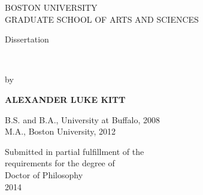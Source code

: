 \begin{titlepage}   %
\begin{center}

  BOSTON UNIVERSITY\\
  GRADUATE SCHOOL OF ARTS AND SCIENCES\\

  \vspace{.5in}

  Dissertation\\

  \vspace{.5in}

  \textbf{\thesistitle}\\

  \vspace{.5in}

  by\\

  \vspace{.5in}

  {\bf ALEXANDER LUKE KITT}\\

  \vspace{.5in}

  \begin{singlespace}
    B.S. and B.A., University at Buffalo, 2008\\
    M.A., Boston University, 2012\\
  \end{singlespace}

  \vfill

  Submitted in partial fulfillment of the\\
  requirements for the degree of\\
  Doctor of Philosophy\\
  2014\\

\end{center}
\end{titlepage}